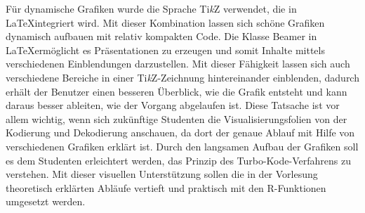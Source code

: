 Für dynamische Grafiken wurde die Sprache Ti\textit{k}Z verwendet, die in \LaTeX integriert wird. Mit dieser Kombination lassen sich schöne Grafiken dynamisch aufbauen mit relativ kompakten Code. Die Klasse Beamer in \LaTeX ermöglicht es Präsentationen zu erzeugen und somit Inhalte mittels verschiedenen Einblendungen darzustellen. Mit dieser Fähigkeit lassen sich auch verschiedene Bereiche in einer Ti\textit{k}Z-Zeichnung hintereinander einblenden, dadurch erhält der Benutzer einen besseren Überblick, wie die Grafik entsteht und kann daraus besser ableiten, wie der Vorgang abgelaufen ist. Diese Tatsache ist vor allem wichtig, wenn sich zukünftige Studenten die Visualisierungsfolien von der Kodierung und Dekodierung anschauen, da dort der genaue Ablauf mit Hilfe von verschiedenen Grafiken erklärt ist. Durch den langsamen Aufbau der Grafiken soll es dem Studenten erleichtert werden, das Prinzip des Turbo-Kode-Verfahrens zu verstehen. Mit dieser visuellen Unterstützung sollen die in der Vorlesung theoretisch erklärten Abläufe vertieft und praktisch mit den R-Funktionen umgesetzt werden.  